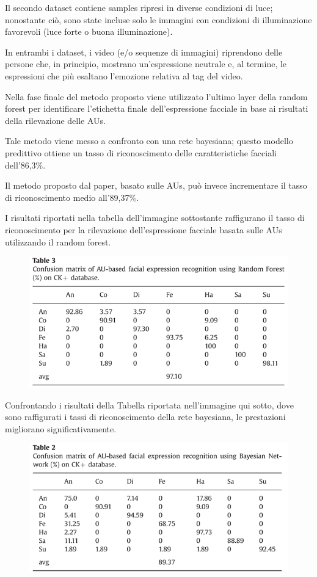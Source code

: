Il secondo dataset contiene samples ripresi in diverse condizioni di luce; nonostante ciò, sono state incluse solo le immagini con condizioni di illuminazione favorevoli (luce forte o buona illuminazione).

In entrambi i dataset, i video (e/o sequenze di immagini) riprendono delle persone che, in principio, mostrano un’espressione neutrale e, al termine, le espressioni che più esaltano l’emozione relativa al tag del video.

Nella fase finale del metodo proposto viene utilizzato l’ultimo layer della random forest per identificare l'etichetta finale dell'espressione facciale in base ai risultati della rilevazione delle AUs. 

Tale metodo viene messo a confronto con una rete bayesiana; questo modello predittivo ottiene un tasso di riconoscimento delle caratteristiche facciali dell’86,3\%. 

Il metodo proposto dal paper, basato sulle AUs, può invece incrementare il tasso di riconoscimento medio all’89,37\%. 

I risultati riportati nella tabella dell’immagine sottostante raffigurano il tasso di riconoscimento per la rilevazione dell'espressione facciale basata sulle AUs utilizzando il random forest. 
\begin{figure}
    \begin{center}    
        \includegraphics[width=0.7\linewidth]{images/15.png}
    \end{center}
\end{figure}

Confrontando i risultati della Tabella riportata nell’immagine qui sotto, dove sono raffigurati i tassi di riconoscimento della rete bayesiana, le prestazioni migliorano significativamente. 
\begin{figure}
    \begin{center}    
        \includegraphics[width=0.7\linewidth]{images/16.png}
    \end{center}
\end{figure}

